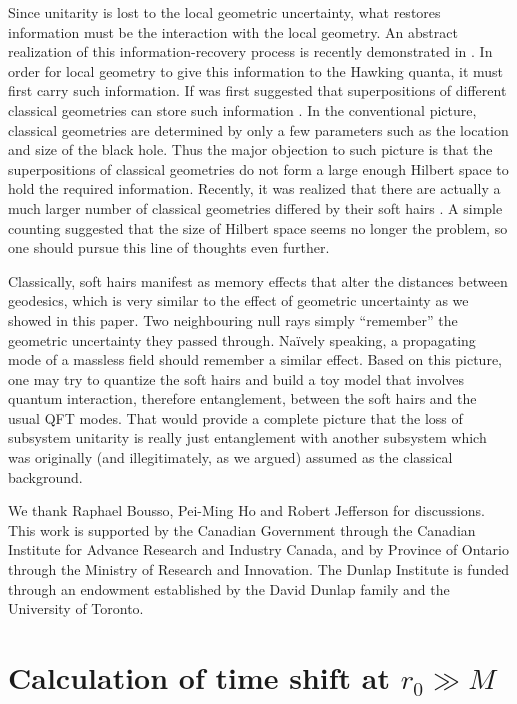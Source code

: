 \documentclass[aps,showpacs,onecolumn,floats,prd,superscriptaddress,nofootinbib]{revtex4-1}
\begin{document}
Since unitarity is lost to the local geometric uncertainty, what restores information must be the interaction with the local geometry. 
An abstract realization of this information-recovery process is recently demonstrated in \cite{OsuPag16}. 
In order for local geometry to give this information to the Hawking quanta, it must first carry such information.
If was first suggested that superpositions of different classical geometries can store such information \cite{NomVar12}.
In the conventional picture, classical geometries are determined by only a few parameters such as the location and size of the black hole.
Thus the major objection to such picture is that the superpositions of classical geometries do not form a large enough Hilbert space to hold the required information.
Recently, it was realized that there are actually a much larger number of classical geometries differed by their soft hairs \cite{HawPer16}.
A simple counting suggested that the size of Hilbert space seems no longer the problem, so one should pursue this line of thoughts even further.

Classically, soft hairs manifest as memory effects that alter the distances between geodesics, which is very similar to the effect of geometric uncertainty as we showed in this paper.
Two neighbouring null rays simply ``remember'' the geometric uncertainty they passed through.
Na\"ively speaking, a propagating mode of a massless field should remember a similar effect. 
Based on this picture, one may try to quantize the soft hairs and build a toy model that involves quantum interaction, therefore entanglement, between the soft hairs and the usual QFT modes.
That would provide a complete picture that the loss of subsystem unitarity is really just entanglement with another subsystem which was originally (and illegitimately, as we argued) assumed as the classical background.

\acknowledgments

We thank Raphael Bousso, Pei-Ming Ho and Robert Jefferson for discussions. 
This work is supported by the Canadian Government through the Canadian Institute for Advance Research and Industry Canada, 
and by Province of Ontario through the Ministry of Research and Innovation. 
The Dunlap Institute is funded through an endowment established by the David Dunlap family and the University of Toronto.

\appendix

\section{Calculation of time shift at $r_0\gg M$}
\label{Dtime}
\end{document}
